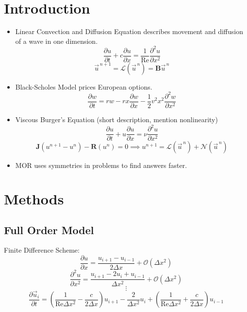 \documentclass{a0poster}
\begin{document}
\begin{multicols}{3}
\section{Introduction}
\LARGE
\begin{itemize}
  \item Linear Convection and Diffusion Equation describes movement and diffusion of a wave in one dimension.
  $$\frac{\partial u}{\partial t} + c \frac{\partial u}{\partial x} = \frac{1}{\mathrm{Re}} \frac{\partial^2 u}{\partial x^2}$$
  $$\vec{u}^{\,n+1} = \mathcal{L}(\vec{u}^{\,n}) = \mathrm{\textbf{B}} \vec{u}^{\,n}$$
  \item Black-Scholes Model prices European options.
  $$\frac{\partial w}{\partial t} = rw - rx \frac{\partial w}{\partial x} - \frac{1}{2} v^2 x^2 \frac{\partial^2 w}{\partial x^2}$$
  \item Viscous Burger's Equation (short description, mention nonlinearity)
  $$\frac{\partial u}{\partial t} + u \frac{\partial u}{\partial x} = \nu \frac{\partial^2 u}{\partial x^2}$$
  $$\mathrm{\textbf{J}} \left( u^{n+1} - u^n \right) - \mathrm{\textbf{R}} \left( u^n \right)=0 \implies u^{n+1} = \mathcal{L}(\vec{u}^{\,n}) + \mathcal{N}(\vec{u}^{\,n})$$
  \item MOR uses symmetries in problems to find answers faster.
\end{itemize}


\section{Methods}
\LARGE
\subsection{Full Order Model}

Finite Difference Scheme:
$$\frac{\partial u}{\partial x} = \frac{u_{i+1} - u_{i-1}}{2 \Delta x} + \mathcal{O}(\Delta x^2)$$
$$\frac{\partial^2 u}{\partial x^2} = \frac{u_{i+1} - 2u_i + u_{i-1}}{\Delta x^2} + \mathcal{O}(\Delta x^2)$$
$$\vdots$$
$$\frac{\partial \vec{u}_i}{\partial t} = \left(\frac{1}{\mathrm{Re} \Delta x^2} - \frac{c}{2 \Delta x}\right)u_{i+1} - \frac{2}{\Delta x^2} u_i + \left( \frac{1}{\mathrm{Re} \Delta x^2} + \frac{c}{2 \Delta x} \right) u_{i-1}$$


\end{multicols}
\end{document}
